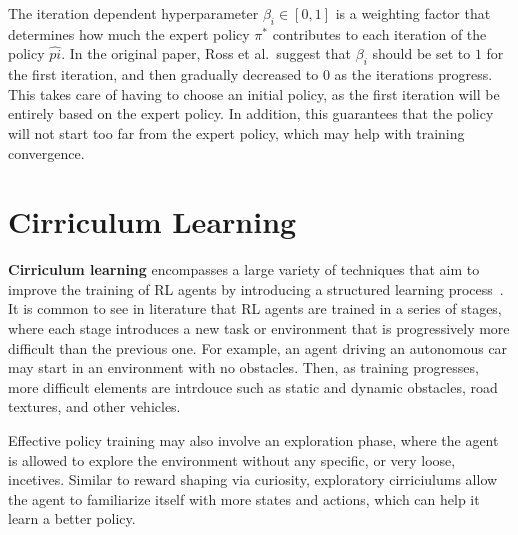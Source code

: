 \documentclass[12pt]{report}
\theoremstyle{definition}
\theoremstyle{remark}
\begin{document}
The iteration dependent hyperparameter $\beta_i \in [0, 1]$ is a weighting factor that determines how much the expert policy $\pi^*$ contributes to each iteration of the policy $\hat{pi}$. In the original paper, Ross et al.\ suggest that $\beta_i$ should be set to $1$ for the first iteration, and then gradually decreased to $0$ as the iterations progress. This takes care of having to choose an initial policy, as the first iteration will be entirely based on the expert policy. In addition, this guarantees that the policy will not start too far from the expert policy, which may help with training convergence.




\section{Cirriculum Learning}
\textbf{Cirriculum learning} encompasses a large variety of techniques that aim to improve the training of RL agents by introducing a structured learning process~\cite{narvekar_curriculum_2020}. It is common to see in literature that RL agents are trained in a series of stages, where each stage introduces a new task or environment that is progressively more difficult than the previous one. For example, an agent driving an autonomous car may start in an environment with no obstacles. Then, as training progresses, more difficult elements are intrdouce such as static and dynamic obstacles, road textures, and other vehicles.

Effective policy training may also involve an exploration phase, where the agent is allowed to explore the environment without any specific, or very loose, incetives. Similar to reward shaping via curiosity, exploratory cirriciulums allow the agent to familiarize itself with more states and actions, which can help it learn a better policy.
\end{document}
